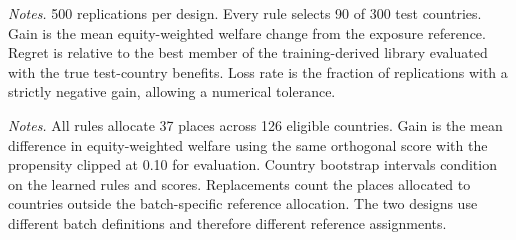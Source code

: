 

\begin{table}[htbp]
\centering
\small
\caption{Quota-preserving rules on independent simulated test countries}
\label{tab:swap_simulation}

\begin{minipage}{0.9\textwidth}\footnotesize\smallskip
\emph{Notes.} 500 replications per design. Every rule selects 90 of 300 test
countries. Gain is the mean equity-weighted welfare change from the exposure
reference. Regret is relative to the best member of the training-derived library
evaluated with the true test-country benefits. Loss rate is the fraction of
replications with a strictly negative gain, allowing a numerical tolerance.
\end{minipage}
\end{table}

\begin{table}[htbp]
\centering
\small
\caption{Estimated welfare changes relative to exposure-based allocation}
\label{tab:swap_application}

\begin{minipage}{0.9\textwidth}\footnotesize\smallskip
\emph{Notes.} All rules allocate 37 places across 126 eligible countries. Gain is the
mean difference in equity-weighted welfare using the same orthogonal score with the
propensity clipped at 0.10 for evaluation. Country bootstrap intervals condition on
the learned rules and scores. Replacements count the places allocated to countries
outside the batch-specific reference allocation. The two designs use different
batch definitions and therefore different reference assignments.
\end{minipage}
\end{table}






